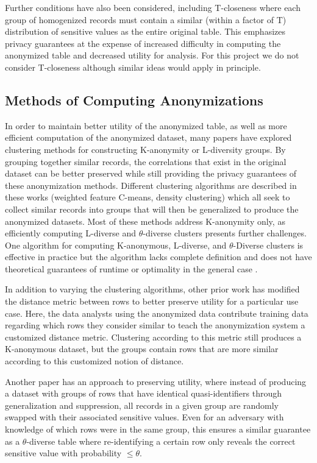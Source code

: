 Further conditions have also been considered, including T-closeness\cite{litCloseness} where each group of homogenized records must contain a similar (within a factor of T) distribution of sensitive values as the entire original table. This emphasizes privacy guarantees at the expense of increased difficulty in computing the anonymized table and decreased utility for analysis. For this project we do not consider T-closeness although similar ideas would apply in principle.

\subsection{Methods of Computing Anonymizations}
In order to maintain better utility of the anonymized table, as well as more efficient computation of the anonymized dataset, many papers have explored clustering methods for constructing K-anonymity or L-diversity groups. By grouping together similar records, the correlations that exist in the original dataset can be better preserved while still providing the privacy guarantees of these anonymization methods\cite{niClustering}\cite{liuDensity}\cite{chiuClustering}. Different clustering algorithms are described in these works (weighted feature C-means, density clustering) which all seek to collect similar records into groups that will then be generalized to produce the anonymized datasets. Most of these methods address K-anonymity only, as efficiently computing L-diverse and $\theta$-diverse clusters presents further challenges. One algorithm for computing K-anonymous, L-diverse, and $\theta$-Diverse clusters is effective in practice but the algorithm lacks complete definition and does not have theoretical guarantees of runtime or optimality in the general case \cite{yangEnhanced}.

In addition to varying the clustering algorithms, other prior work has modified the distance metric between rows to better preserve utility for a particular use case\cite{jiaPad}. Here, the data analysts using the anonymized data contribute training data regarding which rows they consider similar to teach the anonymization system a customized distance metric. Clustering according to this metric still produces a K-anonymous dataset, but the groups contain rows that are more similar according to this customized notion of distance.

Another paper\cite{soriaSwapping} has an approach to preserving utility, where instead of producing a dataset with groups of rows that have identical quasi-identifiers through generalization and suppression, all records in a given group are randomly swapped with their associated sensitive values. Even for an adversary with knowledge of which rows were in the same group, this ensures a similar guarantee as a $\theta$-diverse table where re-identifying a certain row only reveals the correct sensitive value with probability $\leq\theta$. 

